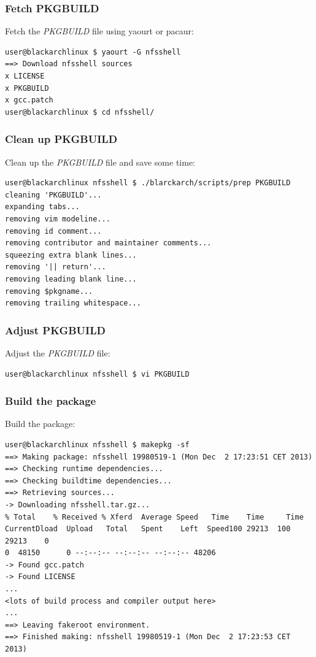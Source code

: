\documentclass[a4paper, oneside, 11pt]{book}
\begin{document}
\subsubsection{Fetch PKGBUILD}
Fetch the \textit{PKGBUILD} file using yaourt or pacaur:
{\small
\color{gray}
\begin{verbatim}
user@blackarchlinux $ yaourt -G nfsshell
==> Download nfsshell sources
x LICENSE
x PKGBUILD
x gcc.patch
user@blackarchlinux $ cd nfsshell/
\end{verbatim}
}

\subsubsection{Clean up PKGBUILD}
Clean up the \textit{PKGBUILD} file and save some time:
{\small
\color{gray}
\begin{verbatim}
user@blackarchlinux nfsshell $ ./blarckarch/scripts/prep PKGBUILD
cleaning 'PKGBUILD'...
expanding tabs...
removing vim modeline...
removing id comment...
removing contributor and maintainer comments...
squeezing extra blank lines...
removing '|| return'...
removing leading blank line...
removing $pkgname...
removing trailing whitespace...
\end{verbatim}
}

\subsubsection{Adjust PKGBUILD}
Adjust the \textit{PKGBUILD} file:
{\small
\color{gray}
\begin{verbatim}
user@blackarchlinux nfsshell $ vi PKGBUILD
\end{verbatim}
}

\subsubsection{Build the package}
Build the package:
{\small
\color{gray}
\begin{verbatim}
user@blackarchlinux nfsshell $ makepkg -sf
==> Making package: nfsshell 19980519-1 (Mon Dec  2 17:23:51 CET 2013)
==> Checking runtime dependencies...
==> Checking buildtime dependencies...
==> Retrieving sources...
-> Downloading nfsshell.tar.gz...
% Total    % Received % Xferd  Average Speed   Time    Time     Time
CurrentDload  Upload   Total   Spent    Left  Speed100 29213  100 29213    0
0  48150      0 --:--:-- --:--:-- --:--:-- 48206
-> Found gcc.patch
-> Found LICENSE
...
<lots of build process and compiler output here>
...
==> Leaving fakeroot environment.
==> Finished making: nfsshell 19980519-1 (Mon Dec  2 17:23:53 CET 2013)
\end{verbatim}
}
\end{document}

